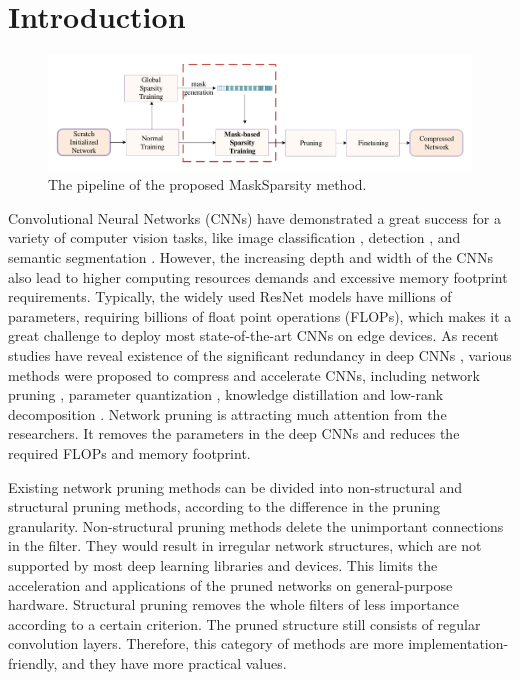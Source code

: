 \documentclass[review]{cvpr}
\begin{document}
\begin{abstract}
 
\end{abstract}

\section{Introduction}\label{introduction}

\begin{figure}[]
	\centering
	\includegraphics[width=0.95\linewidth]{figure/MaskSparsity.pdf}
	\vskip -0.1in
	\caption{The pipeline of the proposed MaskSparsity method.}
	\label{MAskSparsityPipeline}
	\vskip -0.15in
\end{figure}


Convolutional Neural Networks (CNNs) have demonstrated a great success for a variety of computer vision tasks, like image classification \cite{russakovsky2015imagenet}, detection \cite{lin2014microsoft}, and semantic segmentation \cite{Cordts2016Cityscapes}.  However, the increasing depth and width of the CNNs also lead to higher computing resources demands and excessive memory footprint requirements. Typically, the widely used ResNet models \cite{he2016deep} have millions of parameters, requiring billions of float point operations (FLOPs), which makes it a great challenge to deploy most state-of-the-art CNNs on edge devices. As recent studies have reveal existence of the significant redundancy in deep CNNs \cite{denil2013predicting}, various methods were proposed to compress and accelerate CNNs, including network pruning \cite{li2020group}, parameter quantization \cite{jacob2018quantization}, knowledge distillation \cite{hinton2015distilling} and low-rank decomposition \cite{denton2014exploiting}. Network pruning is attracting much attention from the researchers. It removes the parameters in the deep CNNs and reduces the required FLOPs and memory footprint.

Existing network pruning methods can be divided into non-structural and structural pruning methods, according to the difference in the pruning granularity. Non-structural pruning methods delete the unimportant connections in the filter. They would result in irregular network structures, which are not supported by most deep learning libraries and devices. This limits the acceleration and applications of the pruned networks on general-purpose hardware. Structural pruning removes the whole filters of less importance according to a certain criterion. The pruned structure still consists of regular convolution layers. Therefore, this category of methods are more implementation-friendly, and they have more practical values. 
\end{document}
